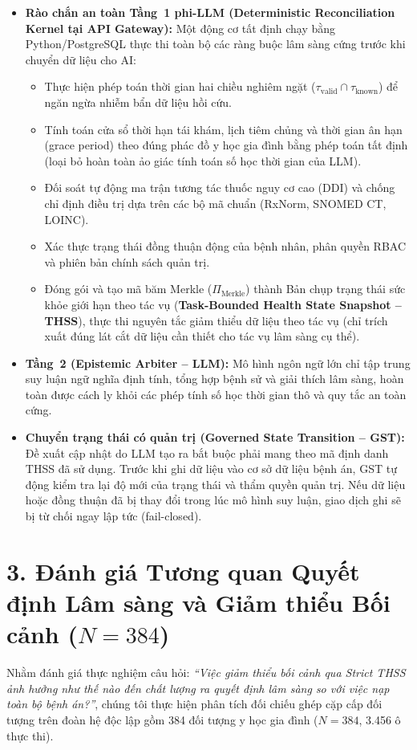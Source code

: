 \documentclass[11pt]{article}
\begin{document}
\begin{itemize}[leftmargin=1.8em]
\item \textbf{Rào chắn an toàn Tầng~1 phi-LLM (Deterministic Reconciliation Kernel tại API Gateway):} Một động cơ tất định chạy bằng Python/PostgreSQL thực thi toàn bộ các ràng buộc lâm sàng cứng trước khi chuyển dữ liệu cho AI:
\begin{itemize}
  \item Thực hiện phép toán thời gian hai chiều nghiêm ngặt ($\tau_{\text{valid}} \cap \tau_{\text{known}}$) để ngăn ngừa nhiễm bẩn dữ liệu hồi cứu.
  \item Tính toán cửa sổ thời hạn tái khám, lịch tiêm chủng và thời gian ân hạn (grace period) theo đúng phác đồ y học gia đình bằng phép toán tất định (loại bỏ hoàn toàn ảo giác tính toán số học thời gian của LLM).
  \item Đối soát tự động ma trận tương tác thuốc nguy cơ cao (DDI) và chống chỉ định điều trị dựa trên các bộ mã chuẩn (RxNorm, SNOMED CT, LOINC).
  \item Xác thực trạng thái đồng thuận động của bệnh nhân, phân quyền RBAC và phiên bản chính sách quản trị.
  \item Đóng gói và tạo mã băm Merkle ($\Pi_{\text{Merkle}}$) thành Bản chụp trạng thái sức khỏe giới hạn theo tác vụ (\textbf{Task-Bounded Health State Snapshot -- THSS}), thực thi nguyên tắc giảm thiểu dữ liệu theo tác vụ (chỉ trích xuất đúng lát cắt dữ liệu cần thiết cho tác vụ lâm sàng cụ thể).
\end{itemize}
\item \textbf{Tầng~2 (Epistemic Arbiter -- LLM):} Mô hình ngôn ngữ lớn chỉ tập trung suy luận ngữ nghĩa định tính, tổng hợp bệnh sử và giải thích lâm sàng, hoàn toàn được cách ly khỏi các phép tính số học thời gian thô và quy tắc an toàn cứng.
\item \textbf{Chuyển trạng thái có quản trị (Governed State Transition -- GST):} Đề xuất cập nhật do LLM tạo ra bắt buộc phải mang theo mã định danh THSS đã sử dụng. Trước khi ghi dữ liệu vào cơ sở dữ liệu bệnh án, GST tự động kiểm tra lại độ mới của trạng thái và thẩm quyền quản trị. Nếu dữ liệu hoặc đồng thuận đã bị thay đổi trong lúc mô hình suy luận, giao dịch ghi sẽ bị từ chối ngay lập tức (fail-closed).
\end{itemize}

\section*{3. Đánh giá Tương quan Quyết định Lâm sàng và Giảm thiểu Bối cảnh ($N=384$)}
Nhằm đánh giá thực nghiệm câu hỏi: \emph{``Việc giảm thiểu bối cảnh qua Strict THSS ảnh hưởng như thế nào đến chất lượng ra quyết định lâm sàng so với việc nạp toàn bộ bệnh án?''}, chúng tôi thực hiện phân tích đối chiếu ghép cặp cấp đối tượng trên đoàn hệ độc lập gồm 384 đối tượng y học gia đình ($N=384$, 3.456 ô thực thi).
\end{document}
